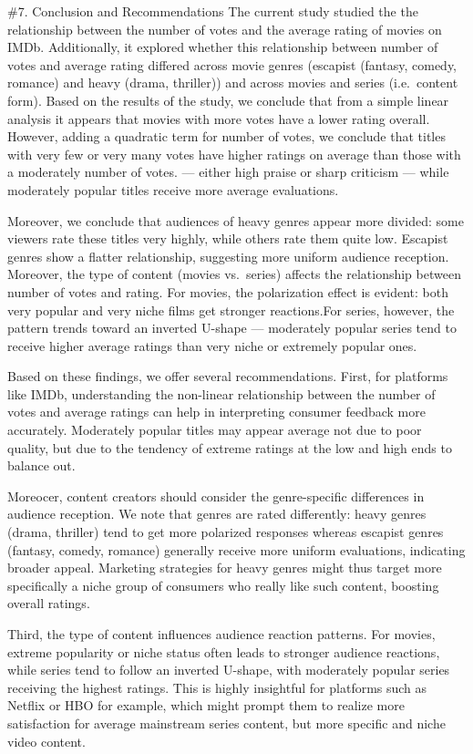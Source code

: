 \documentclass[
  11pt,
]{article}
\begin{document}
\#7. Conclusion and Recommendations The current study studied the the
relationship between the number of votes and the average rating of
movies on IMDb. Additionally, it explored whether this relationship
between number of votes and average rating differed across movie genres
(escapist (fantasy, comedy, romance) and heavy (drama, thriller)) and
across movies and series (i.e.~content form). Based on the results of
the study, we conclude that from a simple linear analysis it appears
that movies with more votes have a lower rating overall. However, adding
a quadratic term for number of votes, we conclude that titles with very
few or very many votes have higher ratings on average than those with a
moderately number of votes. --- either high praise or sharp criticism
--- while moderately popular titles receive more average evaluations.

Moreover, we conclude that audiences of heavy genres appear more
divided: some viewers rate these titles very highly, while others rate
them quite low. Escapist genres show a flatter relationship, suggesting
more uniform audience reception. Moreover, the type of content (movies
vs.~series) affects the relationship between number of votes and rating.
For movies, the polarization effect is evident: both very popular and
very niche films get stronger reactions.For series, however, the pattern
trends toward an inverted U-shape --- moderately popular series tend to
receive higher average ratings than very niche or extremely popular
ones.

Based on these findings, we offer several recommendations. First, for
platforms like IMDb, understanding the non-linear relationship between
the number of votes and average ratings can help in interpreting
consumer feedback more accurately. Moderately popular titles may appear
average not due to poor quality, but due to the tendency of extreme
ratings at the low and high ends to balance out.

Moreocer, content creators should consider the genre-specific
differences in audience reception. We note that genres are rated
differently: heavy genres (drama, thriller) tend to get more polarized
responses whereas escapist genres (fantasy, comedy, romance) generally
receive more uniform evaluations, indicating broader appeal. Marketing
strategies for heavy genres might thus target more specifically a niche
group of consumers who really like such content, boosting overall
ratings.

Third, the type of content influences audience reaction patterns. For
movies, extreme popularity or niche status often leads to stronger
audience reactions, while series tend to follow an inverted U-shape,
with moderately popular series receiving the highest ratings. This is
highly insightful for platforms such as Netflix or HBO for example,
which might prompt them to realize more satisfaction for average
mainstream series content, but more specific and niche video content.
\end{document}

